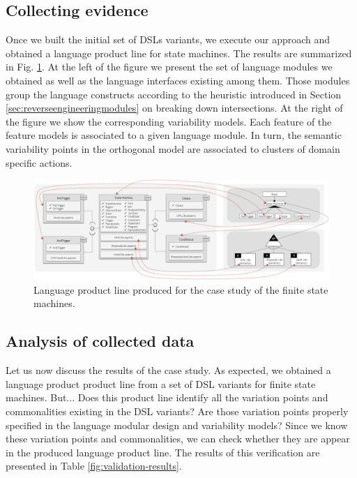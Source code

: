 \subsection{Collecting evidence}

Once we built the initial set of DSLs variants, we execute our approach and obtained a language product line for state machines. The results are summarized in Fig. \ref{fig:results-casestudy}. At the left of the figure we present the set of language modules we obtained as well as the language interfaces existing among them. Those modules group the language constructs according to the heuristic introduced in Section \ref{sec:reverseengineeringmodules} on breaking down intersections. At the right of the figure we show the corresponding variability models. Each feature of the feature models is associated to a given language module. In turn, the semantic variability points in the orthogonal model are associated to clusters of domain specific actions.


\begin{figure}
	\centering
	\includegraphics[width=1\linewidth]{images/results-casestudy.png}
	\caption{Language product line produced for the case study of the finite state machines. }
	\label{fig:results-casestudy}
\end{figure}

\subsection{Analysis of collected data}

Let us now discuss the results of the case study. As expected, we obtained a language product product line from a set of DSL variants for finite state machines. But... Does this product line identify all the variation points and commonalities existing in the DSL variants? Are those variation points properly specified in the language modular design and variability models? Since we know these variation points and commonalities, we can check whether they are appear in the produced language product line. The results of this verification are presented in Table \ref{fig:validation-results}.

